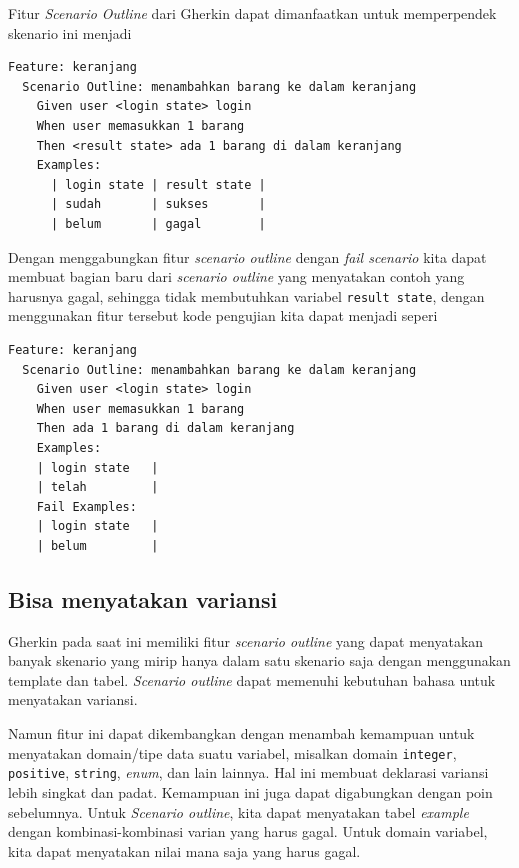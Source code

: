 Fitur \textit{Scenario Outline} dari Gherkin dapat dimanfaatkan untuk memperpendek skenario ini menjadi

\begin{lstlisting}[language=gherkin]
Feature: keranjang
  Scenario Outline: menambahkan barang ke dalam keranjang
    Given user <login state> login
    When user memasukkan 1 barang
    Then <result state> ada 1 barang di dalam keranjang
    Examples:
      | login state | result state |
      | sudah       | sukses       |
      | belum       | gagal        |
\end{lstlisting}

Dengan menggabungkan fitur \emph{scenario outline} dengan \emph{fail scenario}
kita dapat membuat bagian baru dari \emph{scenario outline} yang menyatakan contoh
yang harusnya gagal, sehingga tidak membutuhkan variabel \texttt{result state},
dengan menggunakan fitur tersebut kode pengujian kita dapat menjadi seperi

\begin{lstlisting}[language=gherkin]
Feature: keranjang
  Scenario Outline: menambahkan barang ke dalam keranjang
    Given user <login state> login
    When user memasukkan 1 barang
    Then ada 1 barang di dalam keranjang
    Examples:
    | login state   |
    | telah         |
    Fail Examples:
    | login state   |
    | belum         |
\end{lstlisting}


\subsection{Bisa menyatakan variansi}

Gherkin pada saat ini memiliki fitur \emph{scenario outline} yang dapat menyatakan banyak skenario yang mirip
hanya dalam satu skenario saja dengan menggunakan template dan tabel.
\emph{Scenario outline} dapat memenuhi kebutuhan bahasa untuk menyatakan variansi.

Namun fitur ini dapat dikembangkan dengan menambah kemampuan untuk menyatakan domain/tipe data suatu variabel, misalkan
domain \texttt{integer}, \texttt{positive}, \texttt{string}, \emph{enum}, dan lain lainnya.
Hal ini membuat deklarasi variansi lebih singkat dan padat.
Kemampuan ini juga dapat digabungkan dengan poin sebelumnya.
Untuk \emph{Scenario outline}, kita dapat menyatakan tabel \emph{example} dengan
kombinasi-kombinasi varian yang harus gagal.
Untuk domain variabel, kita dapat menyatakan nilai mana saja yang harus gagal.


